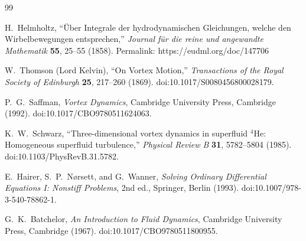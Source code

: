 \begin{thebibliography}{99}

H.~Helmholtz,
``\"Uber Integrale der hydrodynamischen Gleichungen, welche den Wirbelbewegungen entsprechen,''
\textit{Journal f\"ur die reine und angewandte Mathematik} \textbf{55}, 25--55 (1858).
Permalink: https://eudml.org/doc/147706

W.~Thomson (Lord Kelvin),
``On Vortex Motion,''
\textit{Transactions of the Royal Society of Edinburgh} \textbf{25}, 217--260 (1869).
doi:10.1017/S0080456800028179.

P.~G.~Saffman,
\textit{Vortex Dynamics},
Cambridge University Press, Cambridge (1992).
doi:10.1017/CBO9780511624063.

K.~W.~Schwarz,
``Three-dimensional vortex dynamics in superfluid $^4$He: Homogeneous superfluid turbulence,''
\textit{Physical Review B} \textbf{31}, 5782--5804 (1985).
doi:10.1103/PhysRevB.31.5782.

E.~Hairer, S.~P.~N{\o}rsett, and G.~Wanner,
\textit{Solving Ordinary Differential Equations I: Nonstiff Problems}, 2nd ed.,
Springer, Berlin (1993).
doi:10.1007/978-3-540-78862-1.

G.~K.~Batchelor,
\textit{An Introduction to Fluid Dynamics},
Cambridge University Press, Cambridge (1967).
doi:10.1017/CBO9780511800955.

\end{thebibliography}
